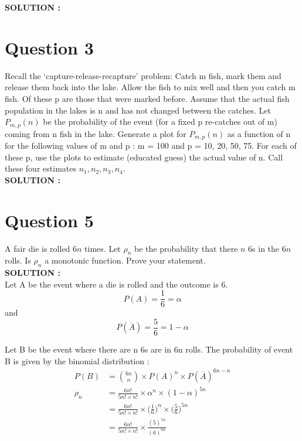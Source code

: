 \documentclass{article}
\begin{document}
\hspace{1em} \large{\textbf{SOLUTION :}} \\

\section{Question 3}
\label{Q3}
  Recall the ‘capture-release-recapture’ problem: Catch m fish, mark them and release them back into the lake. Allow the fish to mix well and then you catch m fish. Of these p are those that were marked before. Assume that the actual fish population in the lakes is n and has not changed between the catches. Let $P_{m,p}(n)$ be the probability of the event (for a fixed p re-catches out of m) coming from n fish in the lake. Generate a plot for $P_{m,p}(n)$ as a function of n for the following values of m and p : m = 100 and p = 10, 20, 50, 75. For each of these p, use the plots to estimate (educated guess) the actual value of n. Call these four estimates $n_1, n_2, n_3, n_4$. \\

\hspace{1em} \large{\textbf{SOLUTION :}} \\

\section{Question 5}
\label{Q5}

A fair die is rolled $6n$ times. Let $\rho_n$ be the probability that there $n$ 6s in the $6n$
rolls. Is $\rho_n$ a monotonic function. Prove your statement. \\

\hspace{1em} \large{\textbf{SOLUTION :}} \\

Let A be the event where a die is rolled and the outcome is 6.
$$P(A) = \frac{1}{6} = \alpha$$
and
$$P(\overline{A}) = \frac{5}{6} = 1 - \alpha$$

Let B be the event where there are n 6s are in 6n rolls. 
The probability of event B is given by the binomial distribution :
\begin{align*}
	P(B) &= {6n \choose n} \times P(A)^n \times P(\overline{A})^{6n-n} \\
	\rho_n &= \frac{6n!}{5n! \times n!} \times \alpha^n \times (1-\alpha)^{5n} \\
	&= \frac{6n!}{5n! \times n!}  \times \Bigg(\frac{1}{6}\Bigg)^n \times \Bigg(\frac{5}{6}\Bigg)^{5n} \\
	&= \frac{6n!}{5n! \times n!} \times \frac{(5)^{5n}}{(6)^{6n}}
\end{align*}
\end{document}
